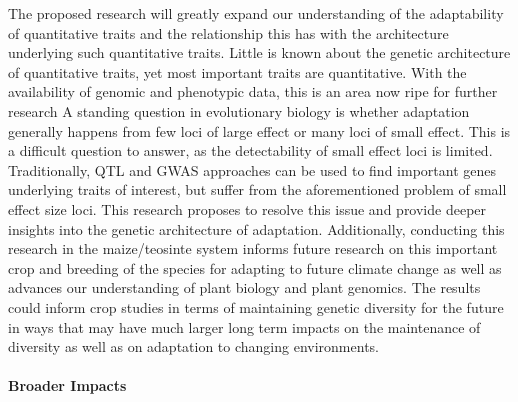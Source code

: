 The proposed research will greatly expand our understanding of the adaptability of quantitative traits and the relationship this has with the architecture underlying such quantitative traits. Little is known about the genetic architecture of quantitative traits, yet most important traits are quantitative. With the availability of genomic and phenotypic data, this is an area now ripe for further research %
A standing question in evolutionary biology is whether adaptation generally happens from few loci of large effect or many loci of small effect. This is a difficult question to answer, as the detectability of small effect loci is limited. Traditionally, QTL and GWAS approaches can be used to find important genes underlying traits of interest, but suffer from the aforementioned problem of small effect size loci. This research proposes to resolve this issue and provide deeper insights into the genetic architecture of adaptation. Additionally, conducting this research in the maize\//teosinte system informs future research on this important crop and breeding of the species for adapting to future climate change as well as advances our understanding of plant biology and plant genomics. The results could inform %
crop studies in terms of maintaining genetic diversity for the future in ways that may have much larger long term impacts on the maintenance of diversity as well as on adaptation to changing environments.

\paragraph{Broader Impacts}

